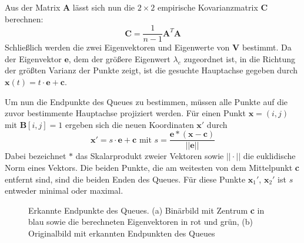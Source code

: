 Aus der Matrix \textbf{A} lässt sich nun die $2 \times 2$ empirische Kovarianzmatrix $\textbf{C}$ berechnen:
\begin{equation*}
	\textbf{C} = \frac{1}{n-1}\textbf{A}^{T}\textbf{A}
\end{equation*}
Schließlich werden die zwei Eigenvektoren und Eigenwerte von $\textbf{V}$ bestimmt. 
Da der Eigenvektor $\textbf{e}$, dem der größere Eigenwert $\lambda_e$ zugeordnet ist, in die Richtung der größten Varianz der Punkte zeigt, ist die gesuchte Hauptachse gegeben durch $\textbf{x}(t) = t \cdot \textbf{e} + \textbf{c}$.

Um nun die Endpunkte des Queues zu bestimmen, müssen alle Punkte auf die zuvor bestimmente Hauptachse projiziert werden.
Für einen Punkt $\textbf{x} = (i, j)$ mit $\textbf{B}[i,j] = 1$ ergeben sich die neuen Koordinaten $\textbf{x}'$ durch
\begin{equation*}
	\textbf{x}' = s \cdot \textbf{e} + \textbf{c}\text{ mit } s = \frac{\textbf{e} * (\textbf{x} - \textbf{c})}{||\textbf{e}||}
\end{equation*}
Dabei bezeichnet $*$ das Skalarprodukt zweier Vektoren sowie $||\cdot||$ die euklidische Norm eines Vektors.
Die beiden Punkte, die am weitesten von dem Mittelpunkt \textbf{c} entfernt sind, sind die beiden Enden des Queues. Für diese Punkte $\textbf{x}_1'$, $\textbf{x}_2'$ ist $s$ entweder minimal oder maximal. 

\begin{figure}[H]
	\label{fig:pca}
	\centering
	\caption{Erkannte Endpunkte des Queues. (a) Binärbild mit Zentrum \textbf{c} in blau sowie die berechneten Eigenvektoren in rot und grün, (b) Originalbild mit erkannten Endpunkten des Queues}
\end{figure}


